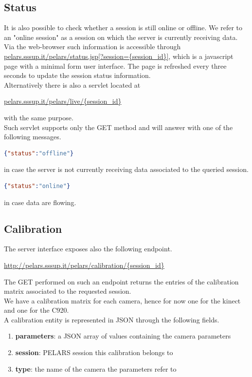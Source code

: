 \documentclass[a4paper,notitlepage,onecolumn]{hitec}  %
\begin{document}
\subsection{Status}
It is also possible to check whether a session is still online or offline. We refer to an "online session" as a session on which the server is currently receiving data.\\
Via the web-browser such information is accessible through\\ \url{pelars.sssup.it/pelars/status.jsp[?session={session\_id}]}, which is a javascript page with a minimal form user interface. The page is refreshed every three seconds to update the session status information.\\ Alternatively there is also a servlet located at \begin{center} \url{pelars.sssup.it/pelars/live/{session\_id}} 
\end{center}with the same purpose.\\Such servlet supports only the GET method and will answer with one of the following messages.
\begin{lstlisting}[language=json,firstnumber=1]  
{"status":"offline"}
\end{lstlisting}
in case the server is not currently receiving data associated to the queried session.
\begin{lstlisting}[language=json,firstnumber=1]  
{"status":"online"}
\end{lstlisting}
in case data are flowing.

\subsection{Calibration}
The server interface exposes also the following endpoint.
\begin{center}
\url{http://pelars.sssup.it/pelars/calibration/{session\_id}}
\end{center}
The GET performed on such an endpoint returns the entries of the calibration matrix associated to the requested session.\\
We have a calibration matrix for each camera, hence for now one for the kinect and one for the C920.\\
A calibration entity is represented in JSON through the following fields.
\begin{enumerate}
\item\textbf{parameters}: a JSON array of values containing the camera parameters
\item \textbf{session}: PELARS session this calibration belongs to
\item\textbf{type}: the name of the camera the parameters refer to
\end{enumerate}
\end{document}
